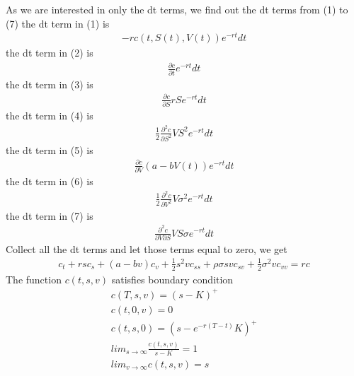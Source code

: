 \documentclass[a4paper]{article}
\begin{document}
As we are interested in only the dt terms, we find out the dt terms from (1) to (7)
the dt term in (1) is
\begin{align*}
	-rc(t, S(t), V(t))e^{-rt}dt
\end{align*}
the dt term in (2) is
\begin{align*}
	\frac{\partial c}{\partial t}e^{-rt}dt
\end{align*}
the dt term in (3) is
\begin{align*}
	\frac{\partial c}{\partial S}rSe^{-rt}dt
\end{align*}
the dt term in (4) is
\begin{align*}
	\frac{1}{2} \frac{\partial^2 c}{\partial S^2}VS^2e^{-rt}dt
\end{align*}
the dt term in (5) is
\begin{align*}
	\frac{\partial c}{\partial V}(a-bV(t))e^{-rt}dt
\end{align*}
the dt term in (6) is
\begin{align*}
	\frac{1}{2} \frac{\partial^2 c}{\partial V^2}V\sigma^2e^{-rt}dt
\end{align*}
the dt term in (7) is
\begin{align*}
	\frac{\partial^2 c}{\partial V \partial S} VS\sigma e^{-rt}dt
\end{align*}
Collect all the dt terms and let those terms equal to zero, we get
\begin{align}\label{c}
	c_t + rs c_s + (a-bv)c_v + \frac{1}{2} s^2 v c_{ss} + \rho \sigma svc_{sv}
	+\frac{1}{2} \sigma^2vc_{vv} = rc
\end{align}
The function $c(t, s, v)$ satisfies boundary condition
\begin{align*}
	c(T, s, v) = (s-K)^+ \\
	c(t, 0, v) = 0 \\
	c(t, s, 0) = (s - e^{-r(T-t)}K)^+\\
	lim_{s \to \infty} \frac{c(t, s, v)}{s-K} = 1 \\
	lim_{v \to \infty} c(t, s, v) = s\\  
\end{align*}
\end{document}
